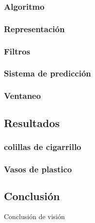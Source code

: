 		\subsubsection*{Algoritmo}
		\subsubsection*{Representaci\'on}
	\subsubsection{Filtros}
	\subsubsection{Sistema de predicci\'on}
	\subsubsection{Ventaneo}
	
	
\subsection{Resultados}
\subsubsection{colillas de cigarrillo}
\subsubsection{Vasos de plastico}
	
	
\subsection{Conclusi\'on}
Conclusi\'on de visi\'on

